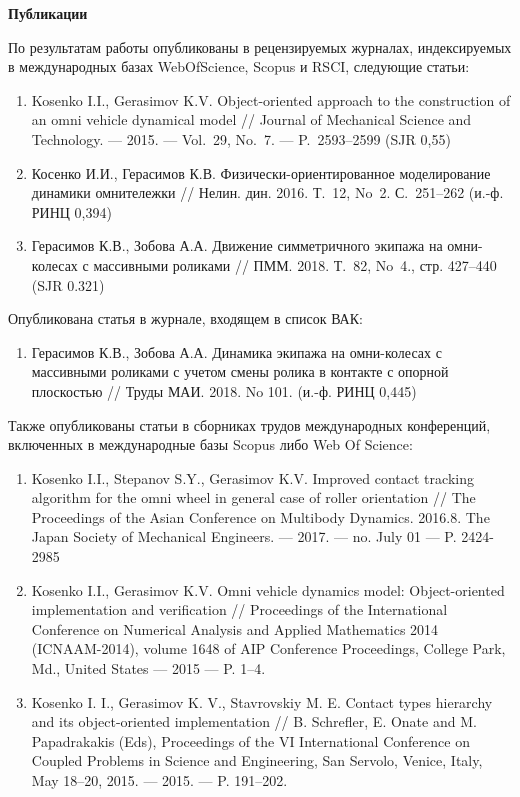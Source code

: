 
\textbf{Публикации}

По результатам работы опубликованы в рецензируемых журналах, индексируемых в международных базах WebOfScience, Scopus и RSCI, следующие статьи:

\begin{enumerate}
    \item Kosenko I.I., Gerasimov K.V. Object-oriented approach to the cons\-truc\-tion of an omni vehicle dynamical model // Journal of Mechanical Science and Technology. — 2015. — Vol.~29, No.~7. — P.~2593--2599 (SJR 0,55)
    \item Косенко И.И., Герасимов К.В. Физически-ориентированное моделирование динамики омнитележки // Нелин. дин. 2016. Т.~12, No~2. С.~251--262 (и.-ф. РИНЦ 0,394)
    \item Герасимов К.В., Зобова А.А. Движение симметричного экипажа на омни-колесах с массивными роликами // ПММ. 2018. Т.~82, No~4., стр. 427--440 (SJR 0.321)
\end{enumerate}
Опубликована статья в журнале, входящем в список ВАК:
\begin{enumerate}
    \addtocounter{enumi}{3}
    \item Герасимов К.В., Зобова А.А. Динамика экипажа на омни-ко\-ле\-сах с массивными роликами с учетом смены ролика в контакте с опорной плоскостью // Труды МАИ. 2018. No 101. (и.-ф. РИНЦ 0,445)
\end{enumerate}
Также опубликованы статьи в сборниках трудов международных конференций, включенных в международные базы Scopus либо Web Of Science:
\begin{enumerate}
    \addtocounter{enumi}{4}
    \item Kosenko I.I., Stepanov S.Y., Gerasimov K.V. Improved contact tracking algorithm for the omni wheel in general case of roller orientation // The Proceedings of the Asian Conference on Multi\-bo\-dy Dynamics. 2016.8. The Japan Society of Mechanical Engineers. — 2017. — no. July 01 — P. 2424-2985
    \item Kosenko I.I., Gerasimov K.V. Omni vehicle dynamics model: Object-oriented implementation and verification // Proceedings of the International Conference on Numerical Analysis and Applied Mathe\-ma\-tics 2014 (ICNAAM-2014), volume 1648 of AIP Conference Pro\-cee\-dings, College Park, Md., United States — 2015 — P. 1–4.
    \item Kosenko I. I., Gerasimov K. V., Stavrovskiy M. E. Contact types hierarchy and its object-oriented implementation // B. Schrefler, E. Onate and M. Papadrakakis (Eds), Proceedings of the VI Inter\-na\-tional Conference on Coupled Problems in Science and Engineering, San Servolo, Venice, Italy, May 18–20, 2015. — 2015. — P. 191–202.
\end{enumerate}
